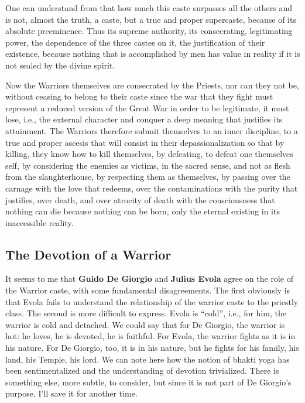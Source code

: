 One can understand from that how much this caste surpasses all the others and is not, almost the truth, a caste, but a true and proper supercaste, because of its absolute preeminence. Thus its supreme authority, its consecrating, legitimating power, the dependence of the three castes on it, the justification of their existence, because nothing that is accomplished by men has value in reality if it is not sealed by the divine spirit.

Now the Warriors themselves are consecrated by the Priests, nor can they not be, without ceasing to belong to their caste since the war that they fight must represent a reduced version of the Great War in order to be legitimate, it must lose, i.e., the external character and conquer a deep meaning that justifies its attainment. The Warriors therefore submit themselves to an inner discipline, to a true and proper ascesis that will consist in their depassionalization so that by killing, they know how to kill themselves, by defeating, to defeat one themselves self, by considering the enemies as victims, in the sacred sense, and not as flesh from the slaughterhouse, by respecting them as themselves, by passing over the carnage with the love that redeems, over the contaminations with the purity that justifies, over death, and over atrocity of death with the consciousness that nothing can die because nothing can be born, only the eternal existing in its inaccessible reality.

\subsection*{The Devotion of a Warrior}

\begin{quotex}
It seems to me that \textbf{Guido De Giorgio} and \textbf{Julius Evola} agree on the role of the Warrior caste, with some fundamental disagreements. The first obviously is that Evola fails to understand the relationship of the warrior caste to the priestly class. The second is more difficult to express. Evola is ``cold'', i.e., for him, the warrior is cold and detached. We could say that for De Giorgio, the warrior is hot: he loves, he is devoted, he is faithful. For Evola, the warrior fights as it is in his nature. For De Giorgio, too, it is in his nature, but he fights for his family, his land, his Temple, his lord. We can note here how the notion of bhakti yoga has been sentimentalized and the understanding of devotion trivialized. There is something else, more subtle, to consider, but since it is not part of De Giorgio's purpose, I'll save it for another time.
\end{quotex}


